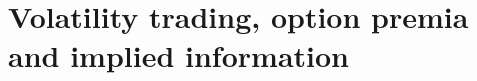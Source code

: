 \chapter{Volatility trading, option premia and implied information}\label{volatility-trading-premia}



